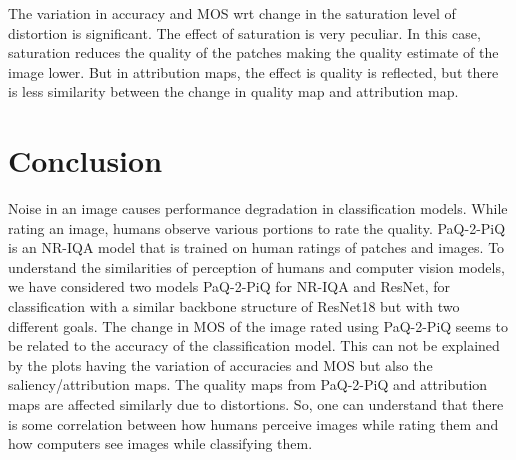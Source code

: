 \documentclass[10pt,twocolumn,letterpaper]{article}
\begin{document}
The variation in accuracy and MOS wrt change in the saturation level of distortion is significant. The effect of saturation is very peculiar. In this case, saturation reduces the quality of the patches making the quality estimate of the image lower. But in attribution maps, the effect is quality is reflected, but there is less similarity between the change in quality map and attribution map.


\section{Conclusion}
Noise in an image causes performance degradation in classification models. While rating an image, humans observe various portions to rate the quality. PaQ-2-PiQ is an NR-IQA model that is trained on human ratings of patches and images. To understand the similarities of perception of humans and computer vision models, we 
have considered two models PaQ-2-PiQ for NR-IQA and ResNet, for classification with a similar backbone structure of ResNet18 but with two different goals. The change in MOS of the image rated using PaQ-2-PiQ seems to be related to the accuracy of the classification model. This can not be explained by the plots having the variation of accuracies and MOS but also the saliency/attribution maps. The quality maps from PaQ-2-PiQ and attribution maps are affected similarly due to distortions. So, one can understand that there is some correlation between how humans perceive images while rating them and how computers see images while classifying them.


{\small


}
\end{document}
